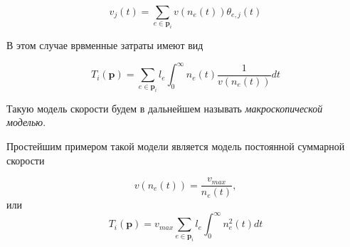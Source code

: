 \documentclass[12pt, a4paper]{article}
\begin{document}
$$v_j(t) = \sum \limits_{e \in \textbf{p}_i} v (n_e (t)) \theta_{e, j} (t)$$

В этом случае врвменные затраты имеют вид

$$T_i (\textbf{p}) = \sum \limits_{e \in \textbf{p}_i} l_e \int_{0}^{\infty} n_e (t) \frac{1}{v(n_e(t))} dt $$

Такую модель скорости будем в дальнейшем называть \textit{макроскопической моделью}.

Простейшим примером такой модели является модель постоянной суммарной скорости 

$$v (n_e (t)) = \frac{v_{max}}{n_e (t)},$$
или
$$T_i (\textbf{p}) = v_{max} \sum \limits_{e \in \textbf{p}_i} l_e \int_{0}^{\infty} n_e^2 (t) dt $$
\end{document}
